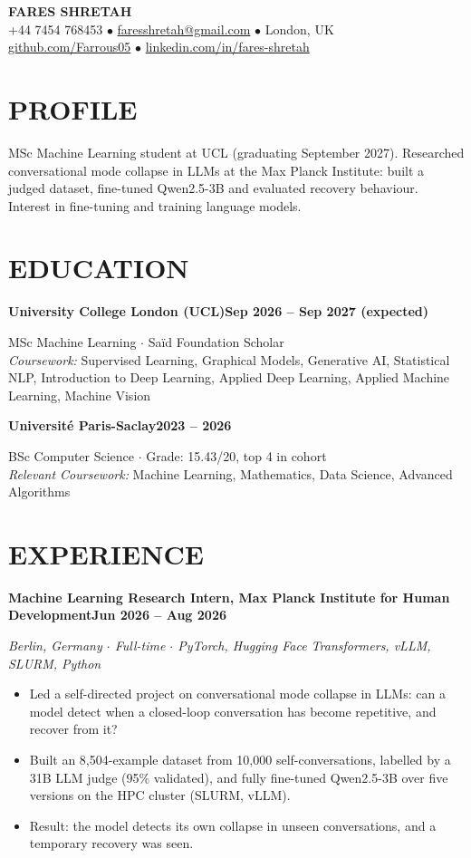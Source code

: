 \documentclass[10pt, a4paper]{article}
\newcommand{\entry}[2]{\vspace{5pt}\textbf{#1}\hfill\textbf{#2}\par}
\newcommand{\sub}[1]{\textit{#1}\par}
\begin{document}
\begin{center}
    {\huge \textbf{FARES SHRETAH}} \\[3pt]
    \small +44 7454 768453 $\bullet$ \href{mailto:faresshretah@gmail.com}{faresshretah@gmail.com} $\bullet$ London, UK \\
    \small \href{https://github.com/Farrous05}{github.com/Farrous05} $\bullet$ \href{https://www.linkedin.com/in/fares-shretah/}{linkedin.com/in/fares-shretah}
\end{center}

\section*{PROFILE}
MSc Machine Learning student at UCL (graduating September 2027). Researched conversational mode collapse in LLMs at the Max Planck Institute: built a judged dataset, fine-tuned Qwen2.5-3B and evaluated recovery behaviour. Interest in fine-tuning and training language models.

\section*{EDUCATION}
\entry{University College London (UCL)}{Sep 2026 -- Sep 2027 (expected)}
MSc Machine Learning $\cdot$ Sa\"id Foundation Scholar \\
\textit{Coursework:} Supervised Learning, Graphical Models, Generative AI, Statistical NLP, Introduction to Deep Learning, Applied Deep Learning, Applied Machine Learning, Machine Vision

\entry{Universit\'e Paris-Saclay}{2023 -- 2026}
BSc Computer Science $\cdot$ Grade: 15.43/20, top 4 in cohort \\
\textit{Relevant Coursework:} Machine Learning, Mathematics, Data Science, Advanced Algorithms

\section*{EXPERIENCE}
\entry{Machine Learning Research Intern, Max Planck Institute for Human Development}{Jun 2026 -- Aug 2026}
\sub{Berlin, Germany $\cdot$ Full-time $\cdot$ PyTorch, Hugging Face Transformers, vLLM, SLURM, Python}
\begin{itemize}
    \item Led a self-directed project on conversational mode collapse in LLMs: can a model detect when a closed-loop conversation has become repetitive, and recover from it?
    \item Built an 8,504-example dataset from 10,000 self-conversations, labelled by a 31B LLM judge (95\% validated), and fully fine-tuned Qwen2.5-3B over five versions on the HPC cluster (SLURM, vLLM).
    \item Result: the model detects its own collapse in unseen conversations, and a temporary recovery was seen.
\end{itemize}
\end{document}
